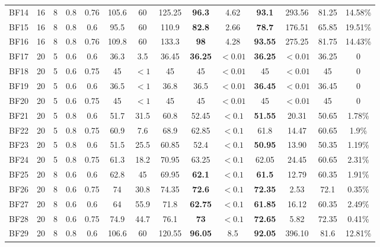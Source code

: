 \documentclass[review,3p,times,authoryear,12pt]{elsarticle}
\begin{document}
\begin{table}[!htb]
\begin{tabular}{c|c|c|c|c|c|c|c|c|c|c|c|c|c}
    BF14  & 16 & 8  & 0.8 & 0.76 & 105.6 & 60    & 125.25 & \textbf{96.3} & 4.62    & \textbf{93.1}  & 293.56  & 81.25 & 14.58\%\\
    BF15  & 16 & 8  & 0.8 & 0.6  & 95.5  & 60    & 110.9  & \textbf{82.8} & 2.66    & \textbf{78.7}  & 176.51  & 65.85 & 19.51\%\\
    BF16  & 16 & 8  & 0.8 & 0.76 & 109.8 & 60    & 133.3  & \textbf{98}   & 4.28    & \textbf{93.55} & 275.25  & 81.75 & 14.43\%\\
    BF17  & 20 & 5  & 0.6 & 0.6  & 36.3  & 3.5   & 36.45  & \textbf{36.25}& $<0.01$ & \textbf{36.25} & $<0.01$ & 36.25 & 0\\
    BF18  & 20 & 5  & 0.6 & 0.75 & 45    & $<1$  & 45     & 45            & $<0.01$ & 45             & $<0.01$ & 45    & 0\\
    BF19  & 20 & 5  & 0.6 & 0.6  & 36.5  & $<1$  & 36.8   & 36.5          & $<0.01$ & \textbf{36.45} & $<0.01$ & 36.45 & 0\\
    BF20  & 20 & 5  & 0.6 & 0.75 & 45    & $<1$  & 45     & 45            & $<0.01$ & 45             & $<0.01$ & 45    & 0\\
    BF21  & 20 & 5  & 0.8 & 0.6  & 51.7  & 31.5  & 60.8   & 52.45         & $<0.1$  & \textbf{51.55} & 20.31   & 50.65 & 1.78\%\\
    BF22  & 20 & 5  & 0.8 & 0.75 & 60.9  & 7.6   & 68.9   & 62.85         & $<0.1$  & 61.8           & 14.47   & 60.65 & 1.9\%\\
    BF23  & 20 & 5  & 0.8 & 0.6  & 51.5  & 25.5  & 60.85  & 52.4          & $<0.1$  & \textbf{50.95} & 13.90   & 50.35 & 1.19\%\\
    BF24  & 20 & 5  & 0.8 & 0.75 & 61.3  & 18.2  & 70.95  & 63.25         & $<0.1$  & 62.05          & 24.45   & 60.65 & 2.31\%\\
    BF25  & 20 & 8  & 0.6 & 0.6  & 62.8  & 45    & 69.95  & \textbf{62.1} & $<0.1$  & \textbf{61.5}  & 12.79   & 60.35 & 1.91\%\\
    BF26  & 20 & 8  & 0.6 & 0.75 & 74    & 30.8  & 74.35  & \textbf{72.6} & $<0.1$  & \textbf{72.35} & 2.53    & 72.1  & 0.35\%\\
    BF27  & 20 & 8  & 0.6 & 0.6  & 64    & 55.9  & 71.8   & \textbf{62.75}& $<0.1$  & \textbf{61.85} & 16.12   & 60.35 & 2.49\%\\
    BF28& 20 & 8  & 0.6 & 0.75 & 74.9  & 44.7  & 76.1   & \textbf{73}   & $<0.1$  & \textbf{72.65} & 5.82    & 72.35 & 0.41\%\\
    BF29  & 20 & 8  & 0.8 & 0.6  & 106.6 & 60    & 120.55 & \textbf{96.05}& 8.5     & \textbf{92.05} & 396.10  & 81.6  & 12.81\%\\

\end{tabular}
\end{table}
\end{document}
